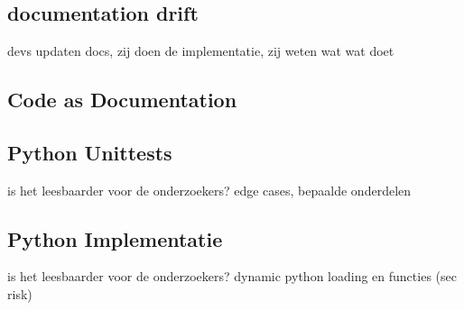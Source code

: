 \section{}
\subsection{documentation drift}
devs updaten docs, zij doen de implementatie, zij weten wat wat doet
\subsection{Code as Documentation}
\subsection{Python Unittests}
is het leesbaarder voor de onderzoekers?
edge cases, bepaalde onderdelen
\subsection{Python Implementatie}
is het leesbaarder voor de onderzoekers?
dynamic python loading en functies (sec risk)
